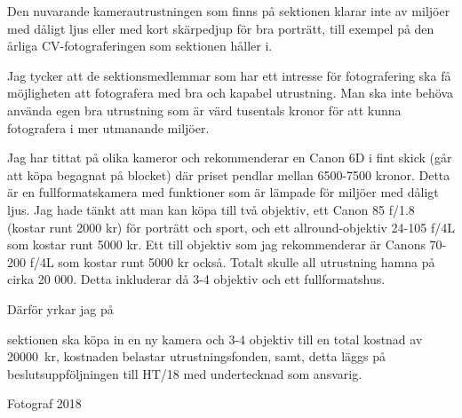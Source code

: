 \documentclass[../_main/handlingar.tex]{subfiles}
\begin{document}

Den nuvarande kamerautrustningen som finns på sektionen klarar inte av miljöer med dåligt ljus eller med kort skärpedjup för bra porträtt, till exempel på den årliga CV-fotograferingen som sektionen håller i. 

Jag tycker att de sektionsmedlemmar som har ett intresse för fotografering ska få möjligheten att fotografera med bra och kapabel utrustning. Man ska inte behöva använda egen bra utrustning som är värd tusentals kronor för att kunna fotografera i mer utmanande miljöer.

Jag har tittat på olika kameror och rekommenderar en Canon 6D i fint skick (går att köpa begagnat på blocket) där priset pendlar mellan 6500-7500 kronor. Detta är en fullformatskamera med funktioner som är lämpade för miljöer med dåligt ljus.
Jag hade tänkt att man kan köpa till två objektiv, ett Canon 85 f/1.8 (kostar runt 2000 kr) för porträtt och sport, och ett allround-objektiv 24-105 f/4L som kostar runt 5000 kr. Ett till objektiv som jag rekommenderar är Canons 70-200 f/4L som kostar runt 5000 kr också. Totalt skulle all utrustning hamna på cirka 20 000. Detta inkluderar då 3-4 objektiv och ett fullformatshus.

Därför yrkar jag på

\begin{attsatser}
    \att sektionen ska köpa in en ny kamera och 3-4 objektiv till en total kostnad av \SI{20000}{kr}, 
    \att kostnaden belastar utrustningsfonden, samt,
    \att detta läggs på beslutsuppföljningen till HT/18 med undertecknad som ansvarig.
\end{attsatser}

\begin{signatures}{1}
    \mvh
    \signature{Eltayeb Bayomi}{Fotograf 2018}
\end{signatures}
\end{document}
